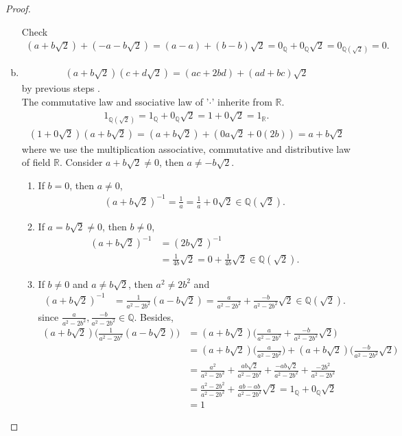 \documentclass{amsart}
\newcommand{\bbr}{\mathbb{R}}
\newcommand{\bbq}{\mathbb{Q}}
\theoremstyle{plain}
\theoremstyle{definition}
\begin{document}
\begin{proof}
\begin{enumerate}[(a)]
				Check 
				\begin{align*}
				(a+b\sqrt 2) +(-a-b\sqrt 2 ) = (a-a)+(b-b)\sqrt 2 = 0_{\bbq} + 0_{\bbq} \sqrt 2 = 0_{\bbq(\sqrt 2)} = 0.
			    \end{align*}
			\item
				\begin{align*}
				(a+b\sqrt 2) ( c+ d \sqrt 2) = (ac+2bd) +(ad+bc)\sqrt 2
			    \end{align*}
				by previous steps .\\
			  The commutative law and ssociative law of '$\cdot$' inherite from $\bbr$. 
			   \begin{align*}
					1_{\bbq(\sqrt 2)} = 1_{\bbq} + 0_{\bbq}\sqrt 2 = 1 + 0\sqrt 2 = 1_{\bbr}.
			  \end{align*}
			  \begin{align*}
				(1+0\sqrt 2) (a+b\sqrt 2) = (a +b\sqrt 2)+(0a\sqrt2 + 0(2b)) = a + b\sqrt 2
			\end{align*}
			where we use the multiplication associative, commutative and distributive law of field $\bbr$.
				Consider $a+b\sqrt 2 \neq 0$, then $a \neq  -b\sqrt 2$.
				\begin{enumerate}[(1)]
					\item If $b=0$, then $a \neq 0$, 
						\begin{align*}
							(a+b\sqrt 2)^{-1} = \frac{1}{a}=\frac{1}{a}+0\sqrt 2 \in \bbq(\sqrt 2).
						\end{align*}
					\item If $a= b\sqrt 2 \neq 0$, then $b\neq 0$, 
						\begin{align*}
							(a+b\sqrt 2)^{-1} &= (2b\sqrt 2)^{-1}\\ &= \frac{1}{4b}\sqrt 2 =0 + \frac{1}{4b}\sqrt 2 \in \bbq(\sqrt 2).
						\end{align*}
				    \item If $b \neq 0 $ and $ a \neq b\sqrt 2$, then $a^2 \neq 2b^2$ and    
				    \begin{align*}
						(a+b\sqrt 2)^{-1} &= \frac{1}{a^2-2b^2}(a-b\sqrt 2) = \frac{a}{a^2-2b^2}+\frac{-b}{a^2-2b^2}\sqrt 2 \in \bbq(\sqrt 2).
					\end{align*}
					since $\frac{a}{a^2-2b^2}, \frac{-b}{a^2-2b^2} \in \bbq$. Besides,\\
						\begin{align*}
							(a+b\sqrt 2)\Big( \frac{1}{a^2-2b^2}(a-b\sqrt 2)\Big) &= (a+b\sqrt 2)\Big(\frac{a}{a^2-2b^2}+\frac{-b}{a^2-2b^2}\sqrt 2 \Big) \\&= (a+b\sqrt 2)\Big(\frac{a}{a^2-2b^2}\Big) + (a+b\sqrt 2)\Big(\frac{-b}{a^2-2b^2}\sqrt 2\Big) \\&=  \frac{a^2}{a^2-2b^2}+\frac{ab\sqrt 2}{a^2-2b^2}+ \frac{-ab\sqrt 2}{a^2-2b^2}+\frac{-2b^2}{a^2-2b^2} \\&= \frac{a^2-2b^2}{a^2-2b^2}+\frac{ab-ab}{a^2-2b^2}\sqrt 2=1_{\bbq}+0_{\bbq}\sqrt 2 \\&= 1

\end{align*}
\end{enumerate}
\end{enumerate}
\end{proof}
\end{document}
